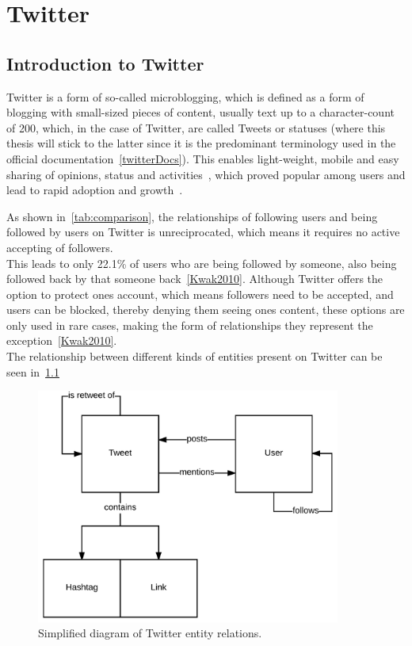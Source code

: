 \chapter{Twitter}
\label{ch:twitter}

\section{Introduction to Twitter}
\label{sec:twitter}

Twitter is a form of so-called microblogging, which is defined as a form of blogging with small-sized pieces of content,
usually text up to a character-count of 200, which, in the case of Twitter, are called Tweets or statuses
(where this thesis will stick to the latter since it is the predominant terminology used in the official documentation~\ref{twitterDocs}).
This enables light-weight, mobile and easy sharing of opinions, status and activities~\cite{Finin2007},
which proved popular among users and lead to rapid adoption and growth~\cite{mcgiboney2009twitter}.
\par
As shown in~\ref{tab:comparison}, the relationships of following users and being followed by users on Twitter is unreciprocated,
which means it requires no active accepting of followers.\\
This leads to only 22.1\% of users who are being followed by someone, also being followed back by that someone back~\ref{Kwak2010}.
Although Twitter offers the option to protect ones account, which means followers need to be accepted,
and users can be blocked, thereby denying them seeing ones content, these options are only used in rare cases,
making the form of relationships they represent the exception~\ref{Kwak2010}.\\
The relationship between different kinds of entities present on Twitter can be seen in~\ref{fig:twitter}
\par

\begin{figure}
    \centering
    \caption{Simplified diagram of Twitter entity relations.}
    \label{fig:twitter}
    \includegraphics[width=10cm]{../figures/twitter_er.pdf}
\end{figure}

